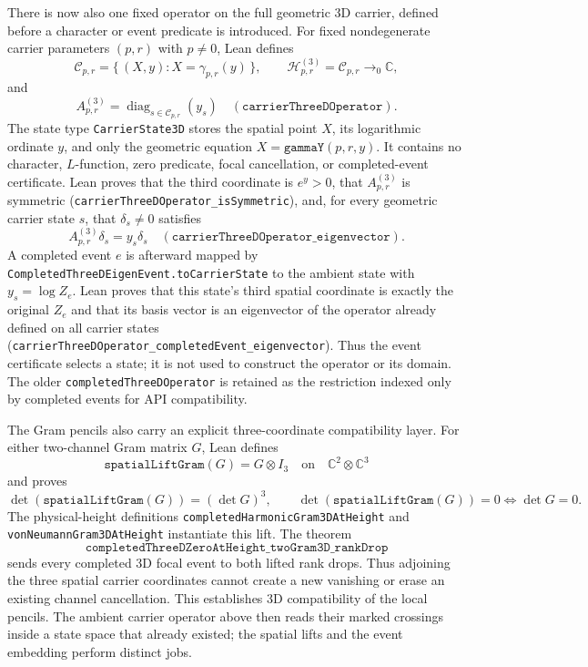 There is now also one fixed operator on the full geometric 3D carrier,
defined before a character or event predicate is introduced.  For fixed
nondegenerate carrier parameters $(p,r)$ with $p\ne0$, Lean defines
\[
 \mathcal C_{p,r}=\{\,(X,y):X=\gamma_{p,r}(y)\,\},\qquad
 \mathcal H^{(3)}_{p,r}=\mathcal C_{p,r}\to_0\mathbb C,
\]
and
\[
 A^{(3)}_{p,r}=\operatorname{diag}_{s\in\mathcal C_{p,r}}(y_s)
 \quad
 (\texttt{carrierThreeDOperator}).
\]
The state type \texttt{CarrierState3D} stores the spatial point $X$, its
logarithmic ordinate $y$, and only the geometric equation
$X=\texttt{gammaY}(p,r,y)$.  It contains no character, $L$-function, zero
predicate, focal cancellation, or completed-event certificate.  Lean proves
that the third coordinate is $e^y>0$, that \(A^{(3)}_{p,r}\) is symmetric
(\texttt{carrierThreeDOperator\_isSymmetric}), and, for every geometric
carrier state $s$, that \(\delta_s\ne0\) satisfies
\[
 A^{(3)}_{p,r}\delta_s=y_s\delta_s
 \quad
 (\texttt{carrierThreeDOperator\_eigenvector}).
\]
A completed event $e$ is afterward mapped by
\texttt{CompletedThreeDEigenEvent.toCarrierState} to the ambient state with
$y_s=\log Z_e$.  Lean proves that this state's third spatial coordinate is
exactly the original $Z_e$ and that its basis vector is an eigenvector of the
operator already defined on all carrier states
(\texttt{carrierThreeDOperator\_completedEvent\_eigenvector}).  Thus the
event certificate selects a state; it is not used to construct the operator
or its domain.  The older \texttt{completedThreeDOperator} is retained as the
restriction indexed only by completed events for API compatibility.

The Gram pencils also carry an explicit three-coordinate compatibility layer.
For either two-channel Gram matrix $G$, Lean defines
\[
 \texttt{spatialLiftGram}(G)=G\otimes I_3
 \quad\text{on}\quad \mathbb C^2\otimes\mathbb C^3
\]
and proves
\[
 \det(\texttt{spatialLiftGram}(G))=(\det G)^3,
 \qquad
 \det(\texttt{spatialLiftGram}(G))=0
 \Longleftrightarrow \det G=0.
\]
The physical-height definitions \texttt{completedHarmonicGram3DAtHeight} and
\texttt{vonNeumannGram3DAtHeight} instantiate this lift.  The theorem
\[
 \texttt{completedThreeDZeroAtHeight\_twoGram3D\_rankDrop}
\]
sends every completed 3D focal event to both lifted rank drops.  Thus adjoining the three spatial carrier coordinates
cannot create a new vanishing or erase an existing channel cancellation.  This
establishes 3D compatibility of the local pencils.  The ambient carrier
operator above then reads their marked crossings inside a state space that
already existed; the spatial lifts and the event embedding perform distinct
jobs.

